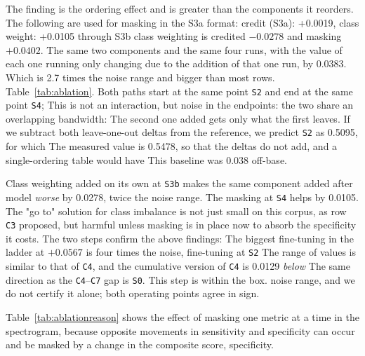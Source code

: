 \documentclass[journal,onecolumn]{IEEEtran}
\begin{document}
The finding is the ordering effect and is greater than the components it reorders. The following are used for masking in the S3a format: credit (S3a): +0.0019, class weight: +0.0105 through S3b
class weighting is credited $-0.0278$ and masking $+0.0402$. The same two components and the
same four runs, with the value of each one running only changing due to the addition of that one run, by 0.0383.
Which is 2.7 times the noise range and bigger than most rows.
Table~\ref{tab:ablation}. Both paths start at the same point \texttt{S2} and end at the same point \texttt{S4};
This is not an interaction, but noise in the endpoints: the two share an overlapping bandwidth:
The second one added gets only what the first leaves.
If we subtract both leave-one-out deltas from the reference, we predict \texttt{S2} as 0.5095, for which
The measured value is 0.5478, so that the deltas do not add, and a single-ordering table would have
This baseline was 0.038 off-base.

Class weighting added on its own at \texttt{S3b} makes the same component added after model \emph{worse} by 0.0278, twice the noise range.
The masking at \texttt{S4} helps by 0.0105. The "go to" solution for class imbalance is not just small on this corpus, as row \texttt{C3} proposed, but harmful unless
masking is in place now to absorb the specificity it costs. The two steps confirm the above findings:
The biggest fine-tuning in the ladder at $+0.0567$ is four times the noise, fine-tuning at \texttt{S2}
The range of values is similar to that of \texttt{C4}, and the cumulative version of \texttt{C4} is 0.0129 \emph{below}
The same direction as the \texttt{C4}--\texttt{C7} gap is \texttt{S0}. This step is within the box.
noise range, and we do not certify it alone; both operating points agree in sign.

Table~\ref{tab:ablationreason} shows the effect of masking one metric at a time in the spectrogram,
because opposite movements in sensitivity and specificity can occur and be masked by a change in the composite score,
specificity.
\end{document}
